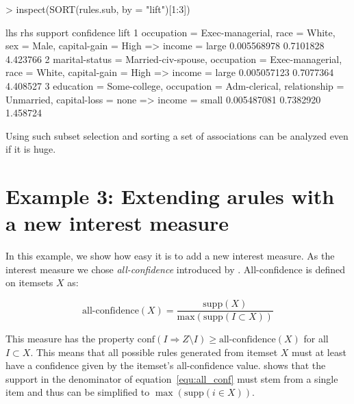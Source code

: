 \documentclass[10pt,a4paper]{article}
\begin{document}
{\samepage\small
\begin{Schunk}
\begin{Sinput}
> inspect(SORT(rules.sub, by = "lift")[1:3])
\end{Sinput}
\begin{Soutput}
  lhs                                      rhs                  support confidence     lift
1 {occupation = Exec-managerial,                                                           
    race = White,                                                                          
    sex = Male,                                                                            
    capital-gain = High}                => {income = large} 0.005568978  0.7101828 4.423766
2 {marital-status = Married-civ-spouse,                                                    
    occupation = Exec-managerial,                                                          
    race = White,                                                                          
    capital-gain = High}                => {income = large} 0.005057123  0.7077364 4.408527
3 {education = Some-college,                                                               
    occupation = Adm-clerical,                                                             
    relationship = Unmarried,                                                              
    capital-loss = none}                => {income = small} 0.005487081  0.7382920 1.458724
\end{Soutput}
\end{Schunk}
}

Using such subset selection and sorting a set of associations can be
analyzed even if it is huge.

\section{Example 3: Extending arules with a new interest measure\label{sec:example-allconf}}

In this example, we show how easy it is to add a new interest measure.
As the interest measure we chose \emph{all-confidence}
introduced by \cite{arules:Omiecinski:2003}. All-confidence is
defined on itemsets $X$ as:

\begin{equation}
\mbox{all-confidence}(X) = \frac{\mathrm{supp}(X)}
{\mathrm{max}(\mathrm{supp}(I \subset X))}
\label{equ:all_conf}
\end{equation}

This measure has the property $\mathrm{conf}(I \Rightarrow Z \setminus
I) \ge \mbox{all-confidence}(X)$ for all $I \subset X$.  This means that
all possible rules generated from itemset $X$ must at least have a
confidence given by the itemset's all-confidence value.
\cite{arules:Omiecinski:2003} shows that the support in the denominator
of equation~\ref{equ:all_conf} must stem from a single item and thus can
be simplified to $\max(\mathrm{supp}(i \in X))$.
\end{document}
